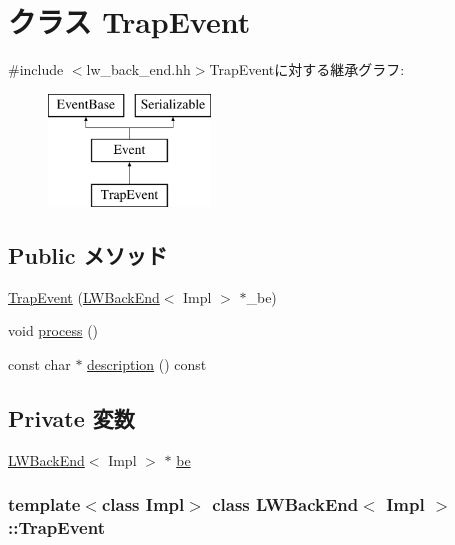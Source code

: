 \hypertarget{classLWBackEnd_1_1TrapEvent}{
\section{クラス TrapEvent}
\label{classLWBackEnd_1_1TrapEvent}
}


{\ttfamily \#include $<$lw\_\-back\_\-end.hh$>$}TrapEventに対する継承グラフ:\begin{figure}[H]
\begin{center}
\leavevmode
\includegraphics[height=3cm]{classLWBackEnd_1_1TrapEvent}
\end{center}
\end{figure}
\subsection*{Public メソッド}
\begin{DoxyCompactItemize}
\item 
\hyperlink{classLWBackEnd_1_1TrapEvent_a4caaa81ac3c9c998182937e381339316}{TrapEvent} (\hyperlink{classLWBackEnd}{LWBackEnd}$<$ Impl $>$ $\ast$\_\-be)
\item 
void \hyperlink{classLWBackEnd_1_1TrapEvent_a2e9c5136d19b1a95fc427e0852deab5c}{process} ()
\item 
const char $\ast$ \hyperlink{classLWBackEnd_1_1TrapEvent_a5a14fe478e2393ff51f02e9b7be27e00}{description} () const 
\end{DoxyCompactItemize}
\subsection*{Private 変数}
\begin{DoxyCompactItemize}
\item 
\hyperlink{classLWBackEnd}{LWBackEnd}$<$ Impl $>$ $\ast$ \hyperlink{classLWBackEnd_1_1TrapEvent_aed04a4a61301f7e61684f9c765c28f15}{be}
\end{DoxyCompactItemize}
\subsubsection*{template$<$class Impl$>$ class LWBackEnd$<$ Impl $>$::TrapEvent}



